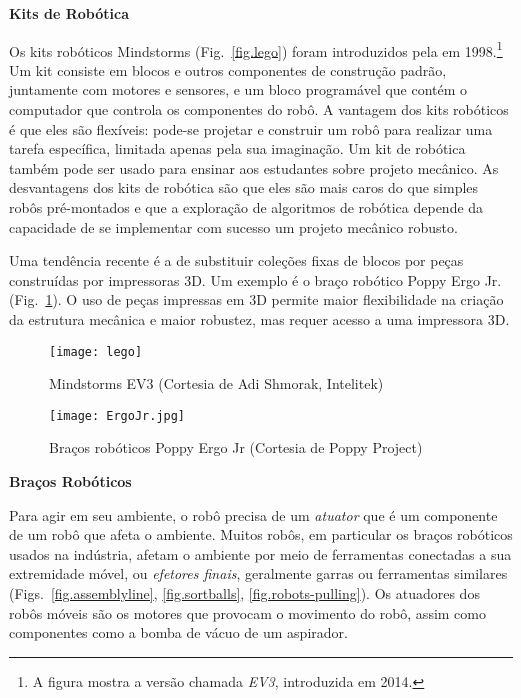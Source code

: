 \smallskip

\noindent\textbf{Kits de Robótica}

Os kits robóticos Mindstorms (Fig.~\ref{fig.lego}) foram introduzidos pela \lego{} em 1998.\footnote{A figura mostra a versão chamada \emph{EV3}, introduzida em 2014.} Um kit consiste em blocos e outros componentes de construção padrão, juntamente com motores e sensores, e um bloco programável que contém o computador que controla os componentes do robô. A vantagem dos kits robóticos é que eles são flexíveis: pode-se projetar e construir um robô para realizar uma tarefa específica, limitada apenas pela sua imaginação. Um kit de robótica também pode ser usado para ensinar aos estudantes sobre projeto mecânico. As desvantagens dos kits de robótica são que eles são mais caros do que simples robôs pré-montados e que a exploração de algoritmos de robótica depende da capacidade de se implementar com sucesso um projeto mecânico robusto.

Uma tendência recente é a de substituir coleções fixas de blocos por peças construídas por impressoras 3D. Um exemplo é o braço robótico Poppy Ergo Jr. (Fig.~\ref{fig.poppy}). O uso de peças impressas em 3D permite maior flexibilidade na criação da estrutura mecânica e maior robustez, mas requer acesso a uma impressora 3D. 

\begin{figure}
\begin{minipage}{.45\textwidth}
\begin{center}
\texttt{[image: lego]}
\end{center}
\caption{\lego{} Mindstorms EV3 (Cortesia de Adi Shmorak, Intelitek)}
\label{fig.lego}
\end{minipage}
\hspace{\fill}
\begin{minipage}{.45\textwidth}
\begin{center}
\texttt{[image: ErgoJr.jpg]}
\end{center}
\caption{Braços robóticos Poppy Ergo Jr (Cortesia de Poppy Project)}
\label{fig.poppy}
\end{minipage}
\end{figure}

\smallskip

\noindent\textbf{Braços Robóticos}

Para agir em seu ambiente, o robô precisa de um \emph{atuator} que é um componente de um robô que afeta o ambiente. Muitos robôs, em particular os braços robóticos usados na indústria, afetam o ambiente por meio de ferramentas conectadas a sua extremidade móvel, ou \emph{efetores finais}, geralmente garras ou ferramentas similares (Figs.~\ref{fig.assemblyline}, \ref{fig.sortballs}, \ref{fig.robots-pulling}). Os atuadores dos robôs móveis são os motores que provocam o movimento do robô, assim como componentes como a bomba de vácuo de um aspirador.

